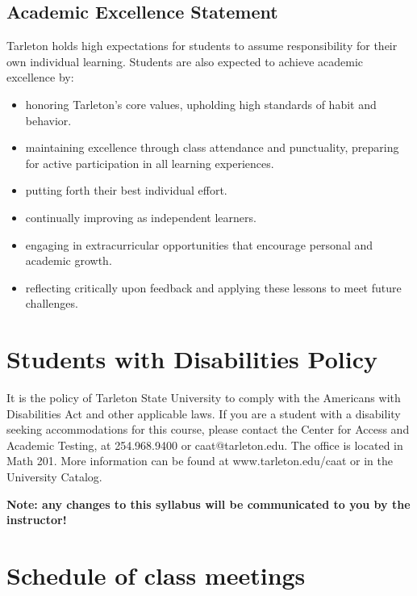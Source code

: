 \documentclass[10pt]{article}
\begin{document}
\subsection*{Academic Excellence Statement}
\label{sec:org1f8ef2b}
Tarleton holds high expectations for students to assume responsibility for their own individual learning. Students are also expected to achieve academic excellence by:
\begin{itemize}
\item honoring Tarleton’s core values, upholding high standards of habit and behavior.
\item maintaining excellence through class attendance and punctuality, preparing for active participation in all learning experiences.
\item putting forth their best individual effort.
\item continually improving as independent learners.
\item engaging in extracurricular opportunities that encourage personal and academic growth.
\item reflecting critically upon feedback and applying these lessons to meet future challenges.
\end{itemize}

\section*{Students with Disabilities Policy}
\label{sec:org845af19}

It is the policy of Tarleton State University to comply with the Americans with Disabilities Act and other applicable laws. If you are a student with a disability seeking accommodations for this course, please contact the Center for Access and Academic Testing, at 254.968.9400 or caat@tarleton.edu. The office is located in Math 201. More information can be found at www.tarleton.edu/caat or in the University Catalog.

\textbf{\textbf{Note:  any changes to this syllabus will be communicated to you by the instructor!}}

\section*{Schedule of class meetings}
\label{sec:org5661ceb}
\end{document}
